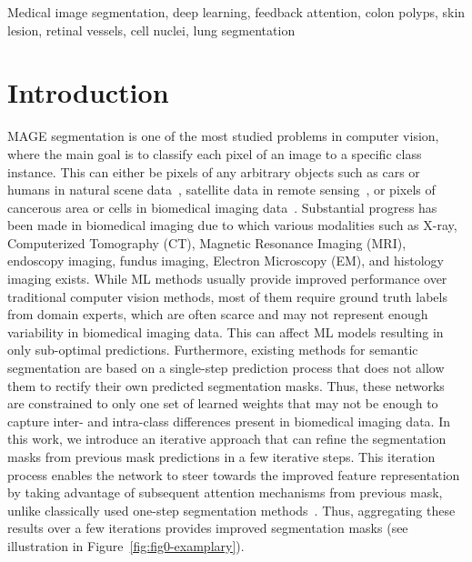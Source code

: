 \documentclass[journal]{IEEEtran}
\begin{document}
\begin{IEEEkeywords}
Medical image segmentation, deep learning, feedback attention, colon polyps, skin lesion, retinal vessels, cell nuclei, lung segmentation
\end{IEEEkeywords}

\IEEEpeerreviewmaketitle

\section{Introduction}
\label{sec:introduction}
MAGE segmentation is one of the most studied problems in computer vision, where the main goal is to classify each pixel of an image to a specific class instance. This can either be pixels of any arbitrary objects such as cars or humans in natural scene data~\cite{chen2017deeplab}, satellite data in remote sensing~\cite{sun2021research, he2021dabnet}, or pixels of cancerous area or cells in biomedical imaging data~\cite{cardona2010integrated}. Substantial progress has been made in biomedical imaging due to which various modalities such as X-ray, Computerized Tomography (CT), Magnetic Resonance Imaging (MRI), endoscopy imaging, fundus imaging, Electron Microscopy (EM), and histology imaging exists.  While \ac{ML} methods usually provide improved performance over traditional computer vision methods, most of them require ground truth labels from domain experts, which are often scarce and may not represent enough variability in biomedical imaging data. This can affect \ac{ML} models resulting in only sub-optimal predictions. Furthermore, existing methods for semantic segmentation are based on a single-step prediction process that does not allow them to rectify their own predicted segmentation masks. Thus, these networks are constrained to only one set of learned weights that may not be enough to capture inter- and intra-class differences present in biomedical imaging data. In this work, we introduce an iterative approach that can refine the segmentation masks from previous mask predictions in a few iterative steps. This iteration process enables the network to steer towards the improved feature representation by taking advantage of subsequent attention mechanisms from previous mask, unlike classically used one-step segmentation methods~\cite{ronneberger2015u,chen2017deeplab}. Thus, aggregating these results over a few iterations provides improved segmentation masks (see illustration in Figure~\ref{fig:fig0-examplary}). 
\end{document}
